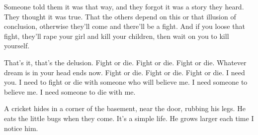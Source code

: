 

Someone told them it was that way, and they forgot it was a story they
heard.  They thought it was true.  That the others depend on this or
that illusion of conclusion, otherwise they'll come and there'll be a
fight.  And if you loose that fight, they'll rape your girl and kill
your children, then wait on you to kill yourself.  

That's it, that's the delusion.  Fight or die.  Fight or die.  Fight
or die.  Whatever dream is in your head ends now.  Fight or die.
Fight or die.  Fight or die.  I need you.  I need to fight or die with
someone who will believe me.  I need someone to believe me.  I need
someone to die with me.

A cricket hides in a corner of the basement, near the door, rubbing
his legs.  He eats the little bugs when they come.  It's a simple
life.  He grows larger each time I notice him.

\bye

